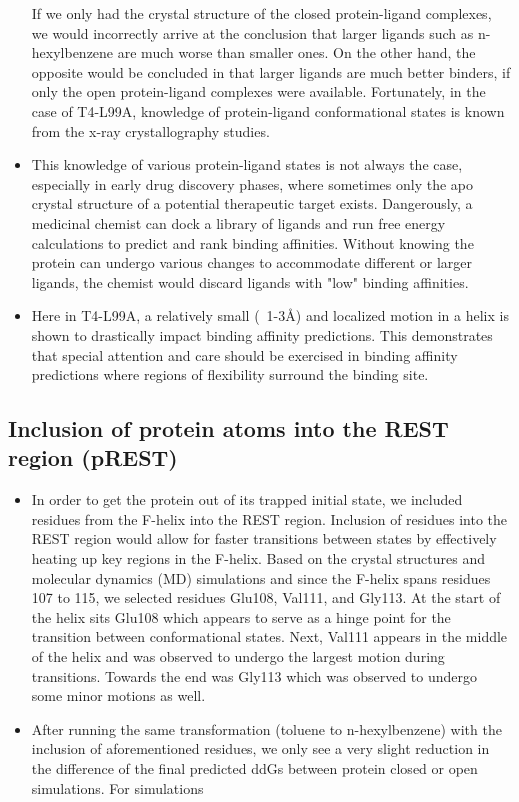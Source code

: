 \documentclass{article}
\begin{document}
\begin{itemize}
      If we only had the crystal structure of the closed protein-ligand complexes, we would incorrectly arrive at the conclusion that larger ligands such as n-hexylbenzene are much worse than smaller ones.
      On the other hand, the opposite would be concluded in that larger ligands are much better binders, if only the open protein-ligand complexes were available.
      Fortunately, in the case of T4-L99A, knowledge of protein-ligand conformational states is known from the x-ray crystallography studies. \cite{Merski2015}
   \item This knowledge of various protein-ligand states is not always the case, especially in early drug discovery phases, where sometimes only the apo crystal structure of a potential therapeutic target exists.
      Dangerously, a medicinal chemist can dock a library of ligands and run free energy calculations to predict and rank binding affinities.
      Without knowing the protein can undergo various changes to accommodate different or larger ligands, the chemist would discard ligands with "low" binding affinities.
   \item Here in T4-L99A, a relatively small (~1-3\AA) and localized motion in a helix is shown to drastically impact binding affinity predictions.
      This demonstrates that special attention and care should be exercised in binding affinity predictions where regions of flexibility surround the binding site.
   \end{itemize}
      
\subsection{Inclusion of protein atoms into the REST region (pREST)}
   \begin{itemize}
   \item In order to get the protein out of its trapped initial state, we included residues from the F-helix into the REST region.
      Inclusion of residues into the REST region would allow for faster transitions between states by effectively heating up key regions in the F-helix.
      Based on the crystal structures and molecular dynamics (MD) simulations and since the F-helix spans residues 107 to 115, we selected residues Glu108, Val111, and Gly113.
      At the start of the helix sits Glu108 which appears to serve as a hinge point for the transition between conformational states. 
      Next, Val111 appears in the middle of the helix and was observed to undergo the largest motion during transitions. 
      Towards the end was Gly113 which was observed to undergo some minor motions as well.
   \item After running the same transformation (toluene to n-hexylbenzene) with the inclusion of aforementioned residues, 
      we only see a very slight reduction in the difference of the final predicted ddGs between protein closed or open simulations.
      For simulations 
     




   \end{itemize}
\end{document}
